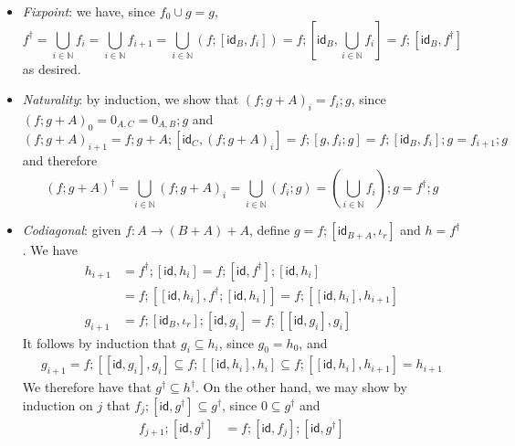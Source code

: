 \documentclass[acmsmall,screen,review]{acmart}
\newcommand{\ms}[1]{\ensuremath{\mathsf{#1}}}
\newcommand{\nats}{\mathbb{N}}
\begin{document}
\begin{itemize}
  \item \emph{Fixpoint}: we have, since $f_0 \cup g = g$,
  \begin{equation*}
    f^\dagger = \bigcup_{i \in \nats}f_i 
               = \bigcup_{i \in \nats}f_{i + 1} 
               = \bigcup_{i \in \nats}(f ; [\ms{id}_B, f_i]) 
               = f ; [\ms{id}_B, \bigcup_{i \in \nats}f_i] 
               = f ; [\ms{id}_B, f^\dagger]
  \end{equation*}
  as desired.
  \item \emph{Naturality}: by induction, we show that $(f ; g + A)_i = f_i ; g$, since 
  $(f ; g + A)_0 = 0_{A, C} = 0_{A, B} ; g$ and
  \begin{equation*}
    (f ; g + A)_{i + 1} = f ; g + A ; [\ms{id}_C, (f ; g + A)_i] 
                        = f ; [g, f_i ; g] = f ; [\ms{id}_B, f_i] ; g = f_{i + 1} ; g
  \end{equation*}
  and therefore
  \begin{equation*}
  (f ; g + A)^\dagger = \bigcup_{i \in \nats}(f ; g + A)_i
  = \bigcup_{i \in \nats}(f_i ; g)
  = (\bigcup_{i \in \nats}f_i) ; g
  = f^\dagger ; g
  \end{equation*}
  \item \emph{Codiagonal}: given $f: A \to (B + A) + A$, define $g = f ; [\ms{id}_{B + A}, \iota_r]$
  and $h = f^\dagger$. We have
  \begin{align*}
    h_{i + 1}
    & = f^\dagger ; [\ms{id}, h_i]
      = f ; [\ms{id}, f^\dagger] ; [\ms{id}, h_i] \\
    & = f ; [[\ms{id}, h_i], f^\dagger ; [\ms{id}, h_i]]
      = f ; [[\ms{id}, h_i], h_{i + 1}] \\
    g_{i + 1} 
    & = f ; [\ms{id}_B, \iota_r] ; [\ms{id}, g_i] 
      = f ; [[\ms{id}, g_i], g_i]
  \end{align*}
  It follows by induction that $g_i \subseteq h_i$, since $g_0 = h_0$, and
  \begin{align*}
  g_{i + 1} 
  = f ; [[\ms{id}, g_i], g_i]
  \subseteq f ; [[\ms{id}, h_i], h_i]
  \subseteq f ; [[\ms{id}, h_i], h_{i + 1}]
  = h_{i + 1}
  \end{align*}
  We therefore have that $g^\dagger \subseteq h^\dagger$. On the other hand, we may show by
  induction on $j$ that $f_j ; [\ms{id}, g^\dagger] \subseteq g^\dagger$, since $0 \subseteq
  g^\dagger$ and
  \begin{align*}
  f_{j + 1} ; [\ms{id}, g^\dagger] 
  & = f ; [\ms{id}, f_j] ; [\ms{id}, g^\dagger]

\end{align*}
\end{itemize}
\end{document}
